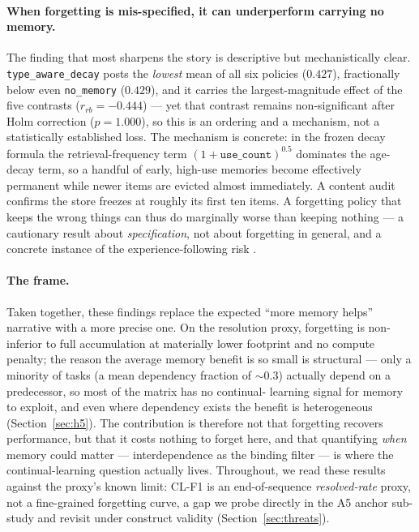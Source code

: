 \paragraph{When forgetting is mis-specified, it can underperform carrying no memory.}
The finding that most sharpens the story is descriptive but mechanistically clear.
\texttt{type\_aware\_decay} posts the \emph{lowest} mean of all six policies ($0.427$),
fractionally below even \texttt{no\_memory} ($0.429$), and it carries the
largest-magnitude effect of the five contrasts ($r_{rb} = -0.444$) --- yet that contrast
remains non-significant after Holm correction ($p = 1.000$), so this is an ordering and a
mechanism, not a statistically established loss. The mechanism is concrete: in the frozen
decay formula the retrieval-frequency term $(1 + \texttt{use\_count})^{0.5}$ dominates the
age-decay term, so a handful of early, high-use memories become effectively permanent
while newer items are evicted almost immediately. A content audit confirms the store
freezes at roughly its first ten items. A forgetting policy that keeps the wrong things can
thus do marginally worse than keeping nothing --- a cautionary result about
\emph{specification}, not about forgetting in general, and a concrete instance of the
experience-following risk \cite{xiong2025}.

\paragraph{The frame.}
Taken together, these findings replace the expected ``more memory helps'' narrative with a
more precise one. On the resolution proxy, forgetting is non-inferior to full accumulation
at materially lower footprint and no compute penalty; the reason the average memory benefit
is so small is structural --- only a minority of tasks (a mean dependency fraction of
$\sim\!0.3$) actually depend on a predecessor, so most of the matrix has no continual-
learning signal for memory to exploit, and even where dependency exists the benefit is
heterogeneous (Section~\ref{sec:h5}). The contribution is therefore not that forgetting
recovers performance, but that it costs nothing to forget here, and that quantifying
\emph{when} memory could matter --- interdependence as the binding filter --- is where the
continual-learning question actually lives. Throughout, we read these results against the
proxy's known limit: CL-F1 is an end-of-sequence \emph{resolved-rate} proxy, not a
fine-grained forgetting curve, a gap we probe directly in the A5 anchor sub-study and
revisit under construct validity (Section~\ref{sec:threats}).

